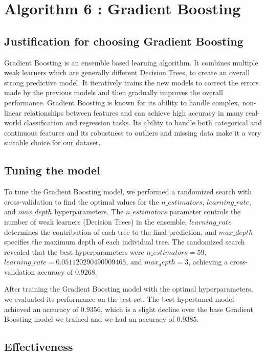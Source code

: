 \section{Algorithm 6 : Gradient Boosting}

\subsection{Justification for choosing Gradient Boosting}

Gradient Boosting is an ensemble based learning algorithm. It combines multiple weak learners which are generally different Decision Trees, to create an overall strong predictive model. It iteratively trains the new models to correct the errors made by the previous models and then gradually improves the overall performance. Gradient Boosting is known for its ability to handle complex, non-linear relationships between features and can achieve high accuracy in many real-world classification and regression tasks. Its ability to handle both categorical and continuous features and its robustness to outliers and missing data make it a very suitable choice for our dataset.


\subsection{Tuning the model}

To tune the Gradient Boosting model, we performed a randomized search with cross-validation to find the optimal values for the $n\_estimators$, $learning\_rate$, and $max\_depth$ hyperparameters. The $n\_estimators$ parameter controls the number of weak learners (Decision Trees) in the ensemble, $learning\_rate$ determines the contribution of each tree to the final prediction, and $max\_depth$ specifies the maximum depth of each individual tree. The randomized search revealed that the best hyperparameters were $n\_estimators=59$, $learning\_rate=0.051120290490909465$, and $max_depth=3$, achieving a cross-validation accuracy of $0.9268$.

After training the Gradient Boosting model with the optimal hyperparameters, we evaluated its performance on the test set. The best hypertuned model achieved an accuracy of $0.9356$, which is a slight decline over the base Gradient Boosting model we trained and we had an accuracy of $0.9385$.


\subsection{Effectiveness}



